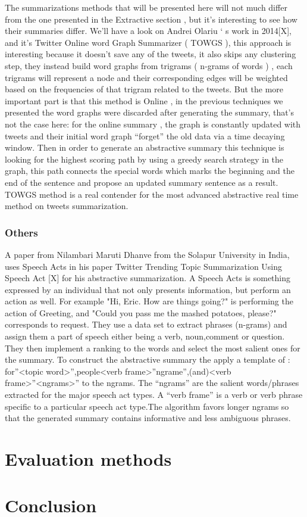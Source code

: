 \documentclass[a4paper, twocolumn]{article}
\begin{document}
The summarizations methods that will be presented here will not much differ
from the one presented in the Extractive section , but it’s interesting to see
how their summaries differ. We’ll have a look on Andrei Olariu ‘ s work in
2014[X], and it’s Twitter Online word Graph Summarizer ( TOWGS ), this approach
is interesting because it doesn’t save any of the tweets, it also skips any
clustering step, they instead build word graphs from trigrams ( n-grams of
words )  , each trigrams will represent a node and their corresponding edges
will be weighted based on the frequencies of that trigram related to the
tweets. But the more important part is that this method is Online , in the
previous techniques we presented the word graphs were discarded after
generating the summary, that’s not the case here: for the online summary , the
graph is constantly updated with tweets and their initial word graph “forget”
the old data via a time decaying window. Then in order to generate an
abstractive summary this technique is looking for the highest scoring path by
using a greedy search strategy  in the graph, this path connects the special
words which marks the beginning and the end of the sentence and propose an
updated summary sentence as a result. TOWGS method is a real contender for the
most advanced abstractive real time method on tweets summarization.

\subsubsection{Others}

A paper from Nilambari Maruti Dhanve from the Solapur University in India, uses
Speech Acts in his paper Twitter Trending Topic Summarization Using Speech Act
[X]  for his abstractive summarization. A Speech Acts is something expressed by
an individual that not only presents information, but perform an action as
well. For example "Hi, Eric. How are things going?" is performing the action of
Greeting, and "Could you pass me the mashed potatoes, please?" corresponds to
request.  They use a data set to extract phrases (n-grams) and assign them a
part of speech either being a verb, noun,comment or question. They then
implement a ranking to the words and select the most salient ones for the
summary. To construct the abstractive summary the apply a template of :
for”<topic word>”,people<verb frame>”ngrame”{,(and)<verb frame>”<ngrams>”} to
the ngrams.  The “ngrams” are the salient words/phrases extracted for the major
speech act types. A “verb frame” is a verb or verb phrase specific to a
particular speech act type.The  algorithm  favors longer ngrams so that the
generated summary contains informative and less ambiguous phrases.

\section{Evaluation methods}

\section{Conclusion}

\printbibliography
\end{document}
